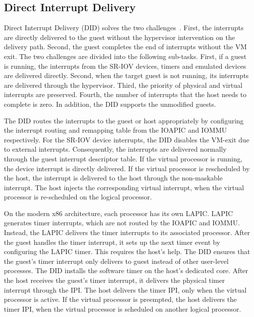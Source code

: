{\subsection{Direct Interrupt Delivery}
Direct Interrupt Delivery (DID) solves the two
challenges~\cite{tu:2015}. First, the interrupts are directly
delivered to the guest without the hypervisor intervention on
the delivery path. Second, the guest completes the end of
interrupts without the VM exit. The two challenges are divided
into the following sub-tasks. First, if a guest is running,
the interrupts from the SR-IOV devices, timers and emulated
devices are delivered directly. Second, when the target guest
is not running, its interrupts are delivered through the
hypervisor. Third, the priority of physical and virtual
interrupts are preserved. Fourth, the number of interrupts
that the host needs to complete is zero. In addition, the DID
supports the unmodified guests.

The DID routes the interrupts to the guest or host
appropriately by configuring the interrupt routing and
remapping table from the IOAPIC and IOMMU respectively. For
the SR-IOV device interrupts, the DID disables the VM-exit due
to external interrupts. Consequently, the interrupts are
delivered normally through the guest interrupt descriptor
table. If the virtual processor is running, the device
interrupt is directly delivered. If the virtual processor is
rescheduled by the host, the interrupt is delivered to the
host through the non-maskable interrupt. The host injects the
corresponding virtual interrupt, when the virtual processor is
re-scheduled on the logical processor.

On the modern x86 architecture, each processor has its own
LAPIC. LAPIC generates timer interrupts, which are not routed
by the IOAPIC and IOMMU. Instead, the LAPIC delivers the timer
interrupts to its associated processor. After the guest
handles the timer interrupt, it sets up the next timer event
by configuring the LAPIC timer. This requires the host's help.
The DID ensures that the guest's timer interrupt only delivers
to guest instead of other user-level processes. The DID
installs the software timer on the host's dedicated core.
After the host receives the guest's timer interrupt, it
delivers the physical timer interrupt through the IPI. The
host delivers the timer IPI, only when the virtual processor
is active. If the virtual processor is preempted, the host
delivers the timer IPI, when the virtual processor is
scheduled on another logical processor.

}
